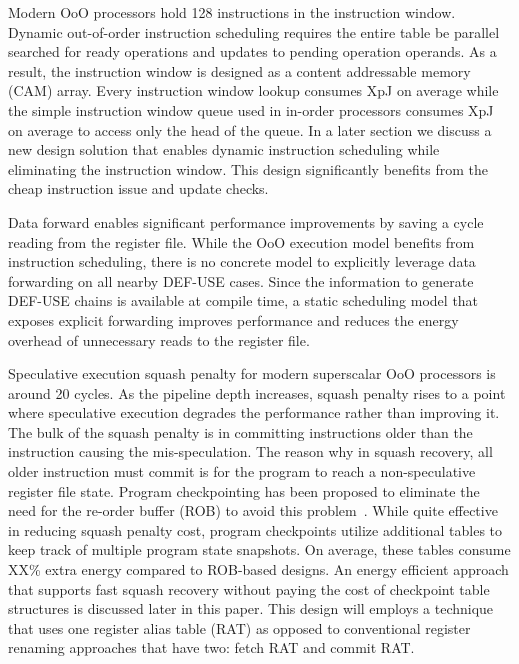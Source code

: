 Modern OoO processors hold 128 instructions in the instruction window. Dynamic
out-of-order instruction scheduling requires the entire table be parallel
searched for ready operations and updates to pending operation operands. As a
result, the instruction window is designed as a content addressable memory (CAM)
    array. Every instruction window lookup consumes XpJ on average while the
    simple instruction window queue used in in-order processors consumes XpJ on
    average to access only the head of the queue. In a later section we discuss
    a new design solution that enables dynamic instruction scheduling while
    eliminating the instruction window. This design significantly benefits from
    the cheap instruction issue and update checks.

Data forward enables significant performance improvements by saving a cycle
reading from the register file. While the OoO execution model benefits from
instruction scheduling, there is no concrete model to explicitly leverage data
forwarding on all nearby DEF-USE cases. Since the information to generate
DEF-USE chains is available at compile time, a static scheduling model that
exposes explicit forwarding improves performance and reduces the energy overhead
of unnecessary reads to the register file.

Speculative execution squash penalty for modern superscalar OoO processors is
around 20 cycles. As the pipeline depth increases, squash penalty rises to a
point where speculative execution degrades the performance rather than improving
it. The bulk of the squash penalty is in committing instructions older than the
instruction causing the mis-speculation.  The reason why in squash recovery, all
older instruction must commit is for the program to reach a non-speculative
register file state.  Program checkpointing has been proposed to eliminate the
need for the re-order buffer (ROB) to avoid this problem~\cite{checkpoint}.
While quite effective in reducing squash penalty cost, program checkpoints
utilize additional tables to keep track of multiple program state snapshots.  On
average, these tables consume XX\% extra energy compared to ROB-based designs.
An energy efficient approach that supports fast squash recovery without paying
the cost of checkpoint table structures is discussed later in this paper. This
design will employs a technique that uses one register alias table (RAT) as
opposed to conventional register renaming approaches that have two: fetch RAT
and commit RAT.

